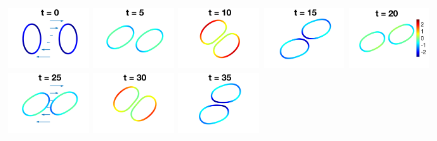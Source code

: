\documentclass[prf,superscriptaddress,showkeys,longbibliography]{revtex4-1}
\begin{document}
\begin{figure}[htp]
  \includegraphics[width=0.19\textwidth]{figs/adR4em1adS7em1Chi5em1_ra090_image01.png}
  \includegraphics[width=0.19\textwidth]{figs/adR4em1adS7em1Chi5em1_ra090_image02.png}
  \includegraphics[width=0.19\textwidth]{figs/adR4em1adS7em1Chi5em1_ra090_image03.png}
  \includegraphics[width=0.19\textwidth]{figs/adR4em1adS7em1Chi5em1_ra090_image04.png}
  \includegraphics[width=0.19\textwidth]{figs/adR4em1adS7em1Chi5em1_ra090_image05.png}
  \includegraphics[width=0.19\textwidth]{figs/adR4em1adS7em1Chi5em1_ra090_image06.png}
  \includegraphics[width=0.19\textwidth]{figs/adR4em1adS7em1Chi5em1_ra090_image07.png}
  \includegraphics[width=0.19\textwidth]{figs/adR4em1adS7em1Chi5em1_ra090_image08.png}

\end{figure}
\end{document}
